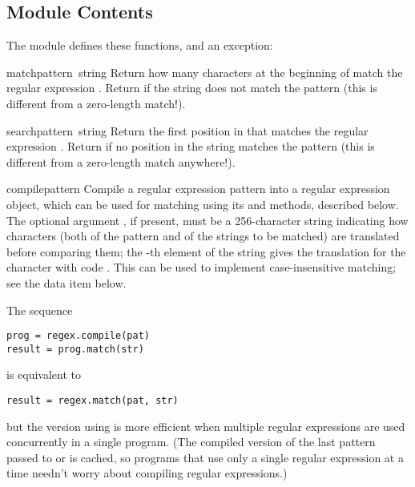 \subsection{Module Contents}

The module defines these functions, and an exception:

\renewcommand{\indexsubitem}{(in module regex)}

\begin{funcdesc}{match}{pattern\, string}
  Return how many characters at the beginning of  match
  the regular expression .  Return  if the
  string does not match the pattern (this is different from a
  zero-length match!).
\end{funcdesc}

\begin{funcdesc}{search}{pattern\, string}
  Return the first position in  that matches the regular
  expression .  Return  if no position in the string
  matches the pattern (this is different from a zero-length match
  anywhere!).
\end{funcdesc}

\begin{funcdesc}{compile}{pattern}
  Compile a regular expression pattern into a regular expression
  object, which can be used for matching using its  and
   methods, described below.  The optional argument
  , if present, must be a 256-character string
  indicating how characters (both of the pattern and of the strings to
  be matched) are translated before comparing them; the -th
  element of the string gives the translation for the character with
  \ASCII{} code .  This can be used to implement
  case-insensitive matching; see the  data item below.

  The sequence

\bcode\begin{verbatim}
prog = regex.compile(pat)
result = prog.match(str)
\end{verbatim}\ecode
%
is equivalent to

\bcode\begin{verbatim}
result = regex.match(pat, str)
\end{verbatim}\ecode
%
but the version using  is more efficient when multiple
regular expressions are used concurrently in a single program.  (The
compiled version of the last pattern passed to  or
 is cached, so programs that use only a single
regular expression at a time needn't worry about compiling regular
expressions.)
\end{funcdesc}


